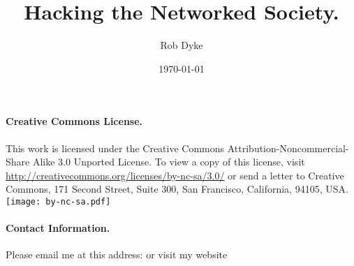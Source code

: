 \documentclass[11pt,titlepage]{book}
\title{Hacking the Networked Society.}
\author{Rob Dyke}
\date{\today}
\begin{document}

\sloppy
\maketitle
\newpage
{}
\paragraph{Creative Commons License.}\newline This work is licensed under the Creative Commons Attribution-Noncommercial-Share Alike 3.0 Unported License. To view a copy of this license, visit \url{http://creativecommons.org/licenses/by-nc-sa/3.0/} or send a letter to Creative Commons, 171 Second Street, Suite 300, San Francisco, California, 94105, USA.
\newline\newline
\texttt{[image: by-nc-sa.pdf]}
\newline\newline
\paragraph{Contact Information.}Please email me at this address:  or visit my website 
\tableofcontents
\newpage
\doublespacing
\end{document}
